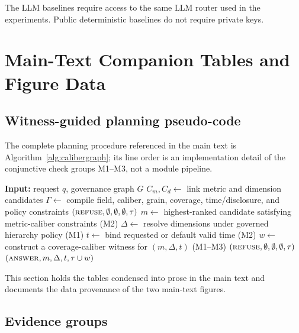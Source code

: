 \documentclass[letterpaper]{article}
\begin{document}
The LLM baselines require access to the same LLM router used in the experiments. Public deterministic baselines do not require private keys.

\section{Main-Text Companion Tables and Figure Data}

\subsection{Witness-guided planning pseudo-code}
The complete planning procedure referenced in the main text is Algorithm~\ref{alg:calibergraph}; its line order is an implementation detail of the conjunctive check groups M1--M3, not a module pipeline.

\begin{algorithm}[tb]
\caption{\textsc{CaliberGraph} witness-guided planning}
\label{alg:calibergraph}
\footnotesize
\begin{algorithmic}[1]
\STATE \textbf{Input:} request $q$, governance graph $G$
\STATE $C_m,C_d\leftarrow$ link metric and dimension candidates
\STATE $\Gamma\leftarrow$ compile field, caliber, grain, coverage, time/disclosure, and policy constraints
    \RETURN $(\textsc{refuse},\emptyset,\emptyset,\emptyset,\tau)$
\ENDIF
\STATE $m\leftarrow$ highest-ranked candidate satisfying metric-caliber constraints \hfill (M2)
\STATE $\Delta\leftarrow$ resolve dimensions under governed hierarchy policy \hfill (M1)
\STATE $t\leftarrow$ bind requested or default valid time \hfill (M2)
\STATE $w\leftarrow$ construct a coverage-caliber witness for $(m,\Delta,t)$ \hfill (M1--M3)
    \RETURN $(\textsc{refuse},\emptyset,\emptyset,\emptyset,\tau)$
\ENDIF
\RETURN $(\textsc{answer},m,\Delta,t,\tau\cup w)$
\end{algorithmic}
\end{algorithm}



This section holds the tables condensed into prose in the main text and documents the data provenance of the two main-text figures.

\subsection{Evidence groups}
\end{document}
